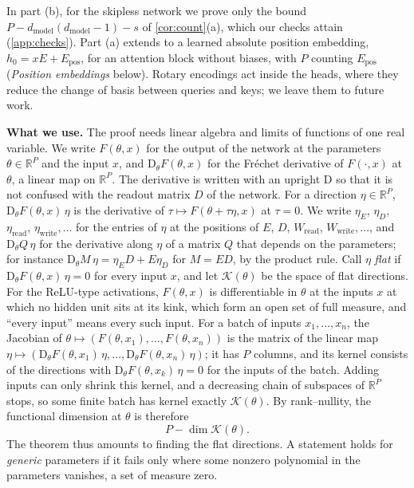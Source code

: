 \documentclass[10pt]{article}
\theoremstyle{definition}
\theoremstyle{remark}
\newcommand{\R}{\mathbb{R}}
\newcommand{\Wread}{W_{\mathrm{read}}}
\newcommand{\Wwrite}{W_{\mathrm{write}}}
\newcommand{\dm}{d_{\mathrm{model}}}
\newcommand{\Der}{\mathrm{D}}
\newcommand{\para}[1]{\smallskip\noindent\textbf{#1}\hspace{0.5em}}
\begin{document}
In part (b), for the skipless network we prove only the bound $P - \dm(\dm-1) - s$ of \cref{cor:count}(a), which our checks attain (\cref{app:checks}). Part (a) extends to a learned absolute position embedding, $h_0 = xE + E_{\mathrm{pos}}$, for an attention block without biases, with $P$ counting $E_{\mathrm{pos}}$ (\emph{Position embeddings} below). Rotary encodings act inside the heads, where they reduce the change of basis between queries and keys; we leave them to future work.

\para{What we use.} The proof needs linear algebra and limits of functions of one real variable. We write $F(\theta, x)$ for the output of the network at the parameters $\theta \in \R^P$ and the input $x$, and $\Der_\theta F(\theta, x)$ for the Fr\'echet derivative of $F(\cdot, x)$ at $\theta$, a linear map on $\R^P$. The derivative is written with an upright $\Der$ so that it is not confused with the readout matrix $D$ of the network. For a direction $\eta \in \R^P$, $\Der_\theta F(\theta, x)\,\eta$ is the derivative of $\tau \mapsto F(\theta + \tau\eta, x)$ at $\tau = 0$. We write $\eta_E$, $\eta_D$, $\eta_{\mathrm{read}}$, $\eta_{\mathrm{write}}, \dots$ for the entries of $\eta$ at the positions of $E$, $D$, $\Wread$, $\Wwrite, \dots$, and $\Der_\theta Q\,\eta$ for the derivative along $\eta$ of a matrix $Q$ that depends on the parameters; for instance $\Der_\theta M\,\eta = \eta_ED + E\eta_D$ for $M = ED$, by the product rule. Call $\eta$ \emph{flat} if $\Der_\theta F(\theta, x)\,\eta = 0$ for every input $x$, and let $\mathcal K(\theta)$ be the space of flat directions. For the ReLU-type activations, $F(\theta, x)$ is differentiable in $\theta$ at the inputs $x$ at which no hidden unit sits at its kink, which form an open set of full measure, and ``every input'' means every such input. For a batch of inputs $x_1, \dots, x_n$, the Jacobian of $\theta \mapsto (F(\theta, x_1), \dots, F(\theta, x_n))$ is the matrix of the linear map $\eta \mapsto (\Der_\theta F(\theta, x_1)\,\eta, \dots, \Der_\theta F(\theta, x_n)\,\eta)$; it has $P$ columns, and its kernel consists of the directions with $\Der_\theta F(\theta, x_k)\,\eta = 0$ for the inputs of the batch. Adding inputs can only shrink this kernel, and a decreasing chain of subspaces of $\R^P$ stops, so some finite batch has kernel exactly $\mathcal K(\theta)$. By rank--nullity, the functional dimension at $\theta$ is therefore
\[
P - \dim\mathcal K(\theta).
\]
The theorem thus amounts to finding the flat directions. A statement holds for \emph{generic} parameters if it fails only where some nonzero polynomial in the parameters vanishes, a set of measure zero.
\end{document}
